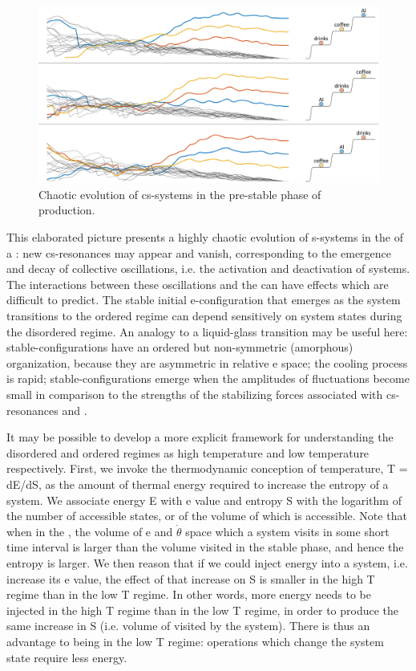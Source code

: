    
\begin{figure}
\includegraphics[width=\textwidth]{figures/Tilsen-img77.png}
\caption{Chaotic evolution of cs-systems in the pre-stable phase of production.}
\label{fig:4:27}
\end{figure}
 

  This elaborated picture presents a highly chaotic evolution of s-systems in the  of a : new cs-resonances may appear and vanish, corresponding to the emergence and decay of collective oscillations, i.e. the activation and deactivation of systems. The interactions between these oscillations and the  can have effects which are difficult to predict. The stable initial e-con\-fig\-u\-ra\-tion that emerges as the system transitions to the ordered regime can depend sensitively on system states during the disordered regime. An analogy to a liquid-glass transition may be useful here: stable-con\-fig\-u\-ra\-tions have an ordered but non-symmetric  (amorphous) organization, because they are asymmetric in relative e space; the cooling process is rapid; stable-con\-fig\-u\-ra\-tions emerge when the amplitudes of fluctuations become small in comparison to the strengths of the stabilizing forces associated with cs-resonances and .

  It may be possible to develop a more explicit framework for understanding the disordered and ordered regimes as high temperature and low temperature respectively. First, we invoke the thermodynamic conception of temperature, T = dE/dS, as the amount of thermal energy required to increase the entropy of a system. We associate energy E with e value and entropy S with the logarithm of the number of accessible states, or of the volume of  which is accessible. Note that when in the , the volume of e and $\dot{\theta}$ space which a system visits in some short time interval is larger than the volume visited in the stable phase, and hence the entropy is larger. We then reason that if we could inject energy into a system, i.e. increase its e value, the effect of that increase on S is smaller in the high T regime than in the low T regime. In other words, more energy needs to be injected in the high T regime than in the low T regime, in order to produce the same increase in S (i.e. volume of  visited by the system). There is thus an advantage to being in the low T regime: operations which change the system state require less energy.

